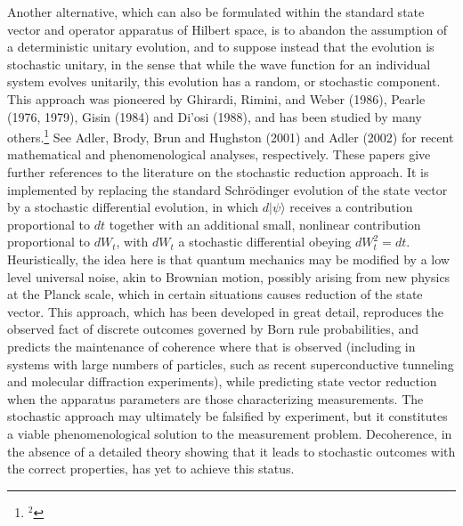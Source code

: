 Another alternative, which can also be formulated within the 
standard state vector and operator apparatus of Hilbert space, is to 
abandon the assumption of a deterministic unitary evolution, and to 
suppose instead that the evolution is stochastic unitary, in the sense 
that while the wave function for an individual system evolves unitarily, 
this evolution has a random, or stochastic component.    This approach  
was pioneered by Ghirardi, Rimini, and Weber (1986), 
Pearle (1976, 1979),  Gisin (1984) and Di'osi (1988), 
and has been studied by many others.\footnote{$^2$} 
{See   Adler, Brody, Brun and 
Hughston (2001) and Adler (2002) for recent mathematical     
and phenomenological analyses, respectively.  These papers give further 
references to the literature on the stochastic reduction approach.}  
It is implemented by 
replacing the standard Schr\"odinger evolution of the state vector by 
a stochastic differential evolution, in which $d|\psi\rangle$ receives a 
contribution proportional to $dt$ together with an 
additional small, nonlinear 
contribution proportional to $dW_t$, with  $dW_t$  a stochastic differential 
obeying $dW_t^2=dt$.  Heuristically, the idea here is that quantum mechanics 
may be modified by a low level universal noise, akin to Brownian motion, 
possibly arising from new physics at the Planck scale, which 
in certain situations causes reduction of the state vector.  
This approach, which has been developed in great detail, reproduces 
the observed fact of discrete outcomes governed by Born rule probabilities, 
and predicts the maintenance of coherence where that is observed (including 
in systems with large numbers of particles, such as recent superconductive 
tunneling and molecular diffraction experiments), while predicting 
state vector reduction when the apparatus parameters are those 
characterizing measurements.
The stochastic approach may ultimately be falsified 
by experiment, but it constitutes a viable phenomenological 
solution to the measurement problem.  Decoherence, in the 
absence of a detailed theory showing that   
it leads to stochastic outcomes with the correct properties, has yet 
to achieve this status.




